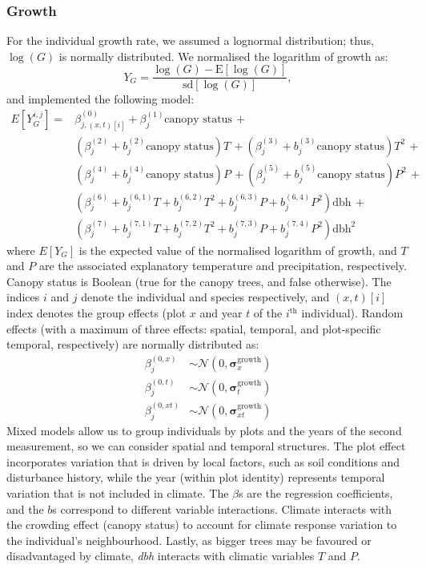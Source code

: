 \subsubsection{Growth}
For the individual growth rate, we assumed a lognormal distribution; thus, $ \log(G) $ is normally distributed. We normalised the logarithm of growth as:
\[
	Y_{G} = \frac{\log(G) - \mathrm{E}[\log(G)]}{\mathrm{sd}[\log(G)]},
\]
and implemented the following model:
\begin{equation} \label{eq::glmm_growth}
\begin{split}
	E[Y_G^{i, j}] = & \beta_{j, (x, t)[i]}^{(0)} + \beta_j^{(1)}  \text{canopy status} \, + \\
	& \left(\beta_j^{(2)} + b_j^{(2)} \text{canopy status} \right) T \, +
	\left(\beta_j^{(3)} + b_j^{(3)} \text{canopy status} \right) T^2 \, + \\
	& \left(\beta_j^{(4)} + b_j^{(4)} \text{canopy status} \right) P \, +
	\left(\beta_j^{(5)} + b_j^{(5)} \text{canopy status} \right) P^2 \, + \\
	& \left( \beta_j^{(6)} + b_j^{(6, 1)} T + b_j^{(6, 2)} T^2 +
		b_j^{(6, 3)} P + b_j^{(6, 4)} P^2 \right) \text{dbh} \, + \\
	& \left( \beta_j^{(7)} + b_j^{(7, 1)} T + b_j^{(7, 2)} T^2 +
		b_j^{(7, 3)} P + b_j^{(7, 4)} P^2 \right) \text{dbh}^2
\end{split}
\end{equation}
where $ E[Y_G] $ is the expected value of the normalised logarithm of growth, and $ T $ and $ P $ are the associated explanatory temperature and precipitation, respectively. Canopy status is Boolean (true for the canopy trees, and false otherwise). The indices $ i $ and $ j $ denote the individual and species respectively, and $ (x, t)[i] $ index denotes the group effects (plot $ x $ and year $ t $ of the $ i^{\text{th}} $ individual). Random effects (with a maximum of three effects: spatial, temporal, and plot-specific temporal, respectively) are normally distributed as:
\begin{align*}
	\beta_{j}^{(0, x)} &\sim \mathcal{N}(0, \bm{\sigma}_{x}^{\text{growth}}) \\
	\beta_{j}^{(0, t)} &\sim \mathcal{N}(0, \bm{\sigma}_{t}^{\text{growth}}) \\
	\beta_{j}^{(0, xt)} &\sim \mathcal{N}(0, \bm{\sigma}_{xt}^{\text{growth}})
\end{align*}
Mixed models allow us to group individuals by plots and the years of the second measurement, so we can consider spatial and temporal structures. The plot effect incorporates variation that is driven by local factors, such as soil conditions and disturbance history, while the year (within plot identity) represents temporal variation that is not included in climate. The $ \beta $s are the regression coefficients, and the $ b $s correspond to different variable interactions. Climate interacts with the crowding effect (canopy status) to account for climate response variation to the individual's neighbourhood. Lastly, as bigger trees may be favoured or disadvantaged by climate, \textit{dbh} interacts with climatic variables $ T $ and $ P $. \\

